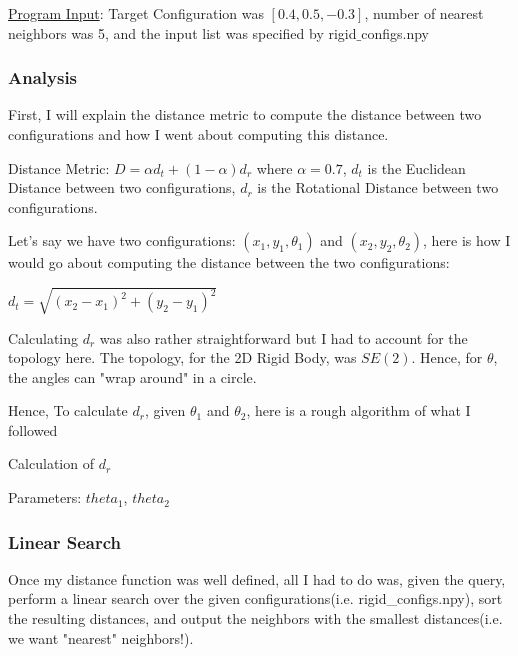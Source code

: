 \documentclass{article}
\begin{document}
\underline{Program Input}: Target Configuration was $[0.4, 0.5, -0.3]$, number of nearest neighbors was 5, and the input list was specified by rigid$\_$configs.npy

\subsubsection{Analysis}
First, I will explain the distance metric to compute the distance between two configurations and how I went about computing this distance.  \newline 

Distance Metric: $D = \alpha d_t + (1 - \alpha) d_r$ \newline 
where $\alpha = 0.7$, $d_t$ is the Euclidean Distance between two configurations, $d_r$ is the Rotational Distance between two configurations. 

Let's say we have two configurations: $(x_1, y_1, \theta_1)$ and $(x_2, y_2, \theta_2)$, here is how I would go about computing the distance between the two configurations: \newline 

$d_t = \sqrt{(x_2 - x_1)^2 + (y_2 - y_1)^2}$ \newline 

Calculating $d_r$ was also rather straightforward but I had to account for the topology here. The topology, for the 2D Rigid Body, was $SE(2)$. Hence, for $\theta$, the angles can "wrap around" in a circle. 

Hence, To calculate $d_r$, given $\theta_1$ and $\theta_2$, here is a rough algorithm of what I followed


\begin{algorithm}
\caption{Calculation of $d_r$}
\begin{algorithmic}
\STATE Parameters: $theta_1$, $theta_2$


\end{algorithmic}
\end{algorithm}

\subsubsection{Linear Search}
Once my distance function was well defined, all I had to do was, given the query, perform a linear search over the given configurations(i.e. rigid\_configs.npy), sort the resulting distances, and output the neighbors with the smallest distances(i.e. we want "nearest" neighbors!). 
\end{document}

